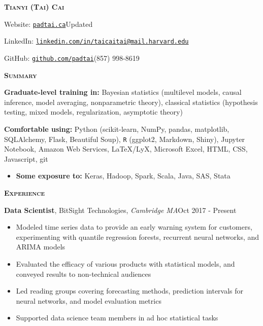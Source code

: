 \documentclass[10pt,english]{article}
\begin{document}
\begin{center}
\textbf{\textsc{Tianyi (Tai) Cai}}
\par\end{center}

Website: \texttt{\textcolor{blue}{\href{https://www.padtai.ca}{padtai.ca}}}\hfill{}Updated
\shortmonthname[\the\month] \the\year

LinkedIn: \texttt{\textcolor{blue}{\href{https://www.linkedin.com/in/taicai/}{linkedin.com/in/taicai}}}\hfill{}\texttt{\textcolor{blue}{\href{mailto:tai@mail.harvard.edu}{tai@mail.harvard.edu}}}

GitHub: \texttt{\textcolor{blue}{\href{https://github.com/padtai}{github.com/padtai}}}\hfill{}(857)
998-8619

\vspace{3mm}
\begin{mdframed}[backgroundcolor=bgcolor,linewidth=3pt]

\textbf{\textsc{Summary}}

\end{mdframed}

\textbf{Graduate-level training in:} Bayesian statistics (multilevel
models, causal inference, model averaging, nonparametric theory),
classical statistics (hypothesis testing, mixed models, regularization,
asymptotic theory)

\vspace{2mm}

\textbf{Comfortable using:} Python (scikit-learn, NumPy, pandas, matplotlib,
SQLAlchemy, Flask, Beautiful Soup), \texttt{R} (ggplot2, Markdown,
Shiny), Jupyter Notebook, Amazon Web Services, \LaTeX/LyX, Microsoft
Excel, HTML, CSS, Javascript, git
\begin{itemize}
\item \textbf{Some exposure to:} Keras, Hadoop, Spark, Scala, Java, SAS,
Stata
\end{itemize}
\vspace{3mm}
\begin{mdframed}[backgroundcolor=bgcolor,linewidth=3pt]

\textbf{\textsc{Experience}}

\end{mdframed}

\textbf{Data Scientist}, BitSight Technologies, \textit{Cambridge
MA}\hfill{}Oct 2017 - Present
\begin{itemize}
\item Modeled time series data to provide an early warning system for customers,
experimenting with quantile regression forests, recurrent neural networks,
and ARIMA models
\item Evaluated the efficacy of various products with statistical models,
and conveyed results to non-technical audiences
\item Led reading groups covering forecasting methods, prediction intervals
for neural networks, and model evaluation metrics
\item Supported data science team members in ad hoc statistical tasks
\end{itemize}
\vspace{2.5mm}
\end{document}
